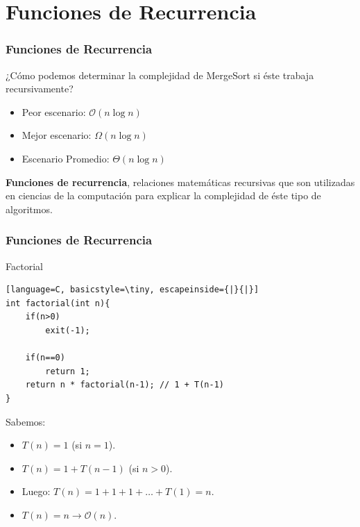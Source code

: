 \documentclass{beamer}
\begin{document}
\section{Funciones de Recurrencia}
\begin{frame}[fragile]
 \frametitle{Funciones de Recurrencia}
\small
¿Cómo podemos determinar la complejidad de MergeSort si éste trabaja recursivamente?
\begin{itemize}
\item Peor escenario: $\mathcal{O}(n \log n)$
\item Mejor escenario: $\Omega(n \log n)$
\item Escenario Promedio: $\Theta(n \log n)$
\end{itemize}

\textbf{Funciones de recurrencia}, relaciones matemáticas recursivas que son utilizadas en ciencias de la computación para explicar la complejidad de éste tipo de algoritmos.
\end{frame}

\begin{frame}[fragile]
 \frametitle{Funciones de Recurrencia}
\small
\begin{exampleblock}{Factorial}
\begin{lstlisting}[language=C, basicstyle=\tiny, escapeinside={|}{|}]
int factorial(int n){
	if(n>0)
		exit(-1);

	if(n==0)
		return 1;
	return n * factorial(n-1); // 1 + T(n-1)
}
\end{lstlisting}
\end{exampleblock}

Sabemos:
\begin{itemize}
\item $T(n) = 1$ (si $n = 1$).
\item $T(n) = 1 + T(n-1)$ (si $n > 0$).
\item Luego: $T(n) = 1 + 1 + 1 + \dots + T(1) = n$.\pause
\item $T(n) = n \rightarrow \mathcal{O}(n)$.
\end{itemize}
\end{frame}
\end{document}
